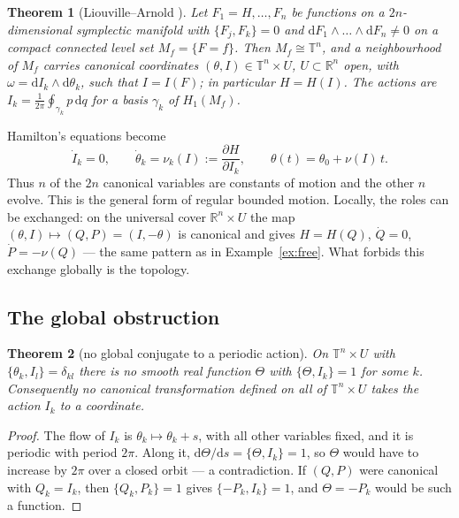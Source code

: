 \documentclass[11pt,a4paper]{article}
\newtheorem{theorem}{Theorem}[section]
\theoremstyle{definition}
\theoremstyle{remark}
\newcommand{\dd}{\mathrm{d}}
\newcommand{\R}{\mathbb{R}}
\newcommand{\Tor}{\mathbb{T}}
\newcommand{\PB}[2]{\{#1,#2\}}
\begin{document}
\begin{theorem}[Liouville--Arnold \cite{arnold}]\label{thm:LA}
Let $F_1=H,\dots,F_n$ be functions on a $2n$-dimensional symplectic manifold with $\PB{F_j}{F_k}=0$ and $\dd F_1\wedge\dots\wedge\dd F_n\neq0$ on a compact connected level set $M_f=\{F=f\}$. Then $M_f\cong\Tor^n$, and a neighbourhood of $M_f$ carries canonical coordinates $(\theta,I)\in\Tor^n\times U$, $U\subset\R^n$ open, with $\omega=\dd I_k\wedge\dd\theta_k$, such that $I=I(F)$; in particular $H=H(I)$. The actions are $I_k=\frac1{2\pi}\oint_{\gamma_k}p\,\dd q$ for a basis $\gamma_k$ of $H_1(M_f)$.
\end{theorem}

Hamilton's equations become
\begin{equation}\label{eq:aa-eom}
\dot I_k=0,\qquad \dot\theta_k=\nu_k(I):=\frac{\partial H}{\partial I_k},\qquad \theta(t)=\theta_0+\nu(I)\,t .
\end{equation}
Thus $n$ of the $2n$ canonical variables are constants of motion and the other $n$ evolve. This is the general form of regular bounded motion. Locally, the roles can be exchanged: on the universal cover $\R^n\times U$ the map $(\theta,I)\mapsto(Q,P)=(I,-\theta)$ is canonical and gives $H=H(Q)$, $\dot Q=0$, $\dot P=-\nu(Q)$ --- the same pattern as in Example~\ref{ex:free}. What forbids this exchange globally is the topology.

\subsection{The global obstruction}

\begin{theorem}[no global conjugate to a periodic action]\label{thm:noconj}
On $\Tor^n\times U$ with $\PB{\theta_k}{I_l}=\delta_{kl}$ there is no smooth real function $\Theta$ with $\PB\Theta{I_k}=1$ for some $k$. Consequently no canonical transformation defined on all of $\Tor^n\times U$ takes the action $I_k$ to a coordinate.
\end{theorem}

\begin{proof}
The flow of $I_k$ is $\theta_k\mapsto\theta_k+s$, with all other variables fixed, and it is periodic with period $2\pi$. Along it, $\dd\Theta/\dd s=\PB\Theta{I_k}=1$, so $\Theta$ would have to increase by $2\pi$ over a closed orbit --- a contradiction. If $(Q,P)$ were canonical with $Q_k=I_k$, then $\PB{Q_k}{P_k}=1$ gives $\PB{-P_k}{I_k}=1$, and $\Theta=-P_k$ would be such a function.
\end{proof}
\end{document}
